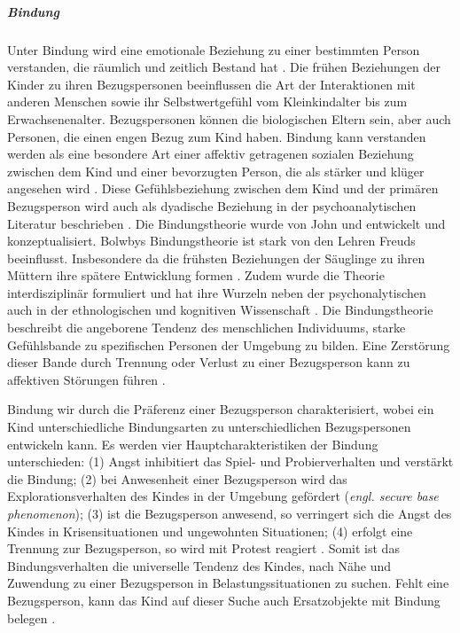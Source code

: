 \subparagraph{Bindung}\label{par:Bindung}
Unter Bindung wird eine emotionale Beziehung zu einer bestimmten Person verstanden, die räumlich und zeitlich Bestand hat \cite[S.~585 ff.]{Siegler2008}. Die frühen Beziehungen der Kinder zu ihren Bezugspersonen beeinflussen die Art der Interaktionen mit anderen Menschen sowie ihr Selbstwertgefühl vom Kleinkindalter bis zum Erwachsenenalter. Bezugspersonen können die biologischen Eltern sein, aber auch Personen, die einen engen Bezug zum Kind haben. Bindung kann verstanden werden als eine besondere Art einer affektiv getragenen sozialen Beziehung zwischen dem Kind und einer bevorzugten Person, die als stärker und klüger angesehen wird \cite{Biringen1994}. Diese Gefühlsbeziehung zwischen dem Kind und der primären Bezugsperson wird auch als dyadische Beziehung in der psychoanalytischen Literatur beschrieben \cite{Resch1999}. Die Bindungstheorie wurde von John \nohyphens{} und  entwickelt und konzeptualisiert. Bolwbys Bindungstheorie ist stark von den Lehren Freuds beeinflusst. Insbesondere da die frühsten Beziehungen der Säuglinge zu ihren Müttern ihre spätere Entwicklung formen \cite{Siegler2008}. Zudem wurde die Theorie interdisziplinär formuliert und hat ihre Wurzeln neben der psychonalytischen auch in der ethnologischen und kognitiven Wissenschaft \cite{Resch1999}. Die Bindungstheorie beschreibt die angeborene Tendenz des menschlichen Individuums, starke Gefühlsbande zu spezifischen Personen der Umgebung zu bilden. Eine Zerstörung dieser Bande durch Trennung oder Verlust zu einer Bezugsperson kann zu affektiven Störungen führen \cite{Resch1999}. 

Bindung wir durch die Präferenz einer Bezugsperson charakterisiert, wobei ein Kind unterschiedliche Bindungsarten zu unterschiedlichen Bezugspersonen entwickeln kann. Es werden vier Hauptcharakteristiken der Bindung unterschieden: (1) Angst inhibitiert das Spiel- und Probierverhalten und verstärkt die Bindung; (2) bei Anwesenheit einer Bezugsperson wird das Explorationsverhalten des Kindes in der Umgebung gefördert (\textit{engl. secure base phenomenon}); (3) ist die Bezugsperson anwesend, so verringert sich die Angst des Kindes in Krisensituationen und ungewohnten Situationen; (4) erfolgt eine Trennung zur Bezugsperson, so wird mit Protest reagiert \cite{Resch1999}. Somit ist das Bindungsverhalten die universelle Tendenz des Kindes, nach Nähe und Zuwendung zu einer Bezugsperson in Belastungssituationen zu suchen. Fehlt eine Bezugsperson, kann das Kind auf dieser Suche auch Ersatzobjekte mit Bindung belegen \cite{Resch1999}.

